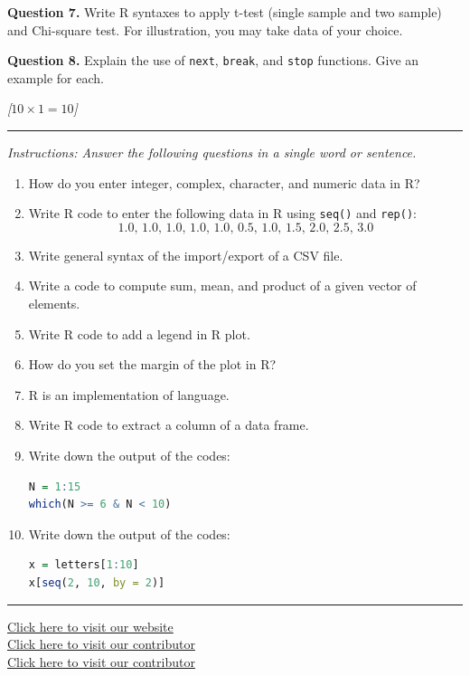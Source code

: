 \documentclass[11pt,a4paper]{article}
\newcommand{\pts}[1]{\hfill   \textit{[#1]}}
\begin{document}
\medskip


\noindent   \textbf{Question 7.} Write R syntaxes to apply t-test (single sample and two sample) and Chi-square test. For illustration, you may take data of your choice.

\medskip


\noindent   \textbf{Question 8.} Explain the use of   \texttt{next},   \texttt{break}, and   \texttt{stop} functions. Give an example for each.

\bigskip


\pts{$10  \times 1 = 10$}
\rule{\linewidth}{0.4pt}\smallskip




\noindent   \textit{Instructions: Answer the following questions in a single word or sentence.}


\begin{enumerate}[label=\arabic*.,leftmargin=*,itemsep=6pt]
  \item How do you enter integer, complex, character, and numeric data in R?
  \item Write R code to enter the following data in R using   \texttt{seq()} and   \texttt{rep()}:
  \[
  1.0, \, 1.0, \, 1.0, \, 1.0, \, 1.0, \, 0.5, \, 1.0, \, 1.5, \, 2.0, \, 2.5, \, 3.0
  \]
  \item Write general syntax of the import/export of a CSV file.
  \item Write a code to compute sum, mean, and product of a given vector of elements.
  \item Write R code to add a legend in R plot.
  \item How do you set the margin of the plot in R?
  \item R is an implementation of \underline{\hspace{1.5cm}} language.
  \item Write R code to extract a column of a data frame.
  \item Write down the output of the codes:
  
\begin{lstlisting}[language=R]
N = 1:15
which(N >= 6 & N < 10)
  \end{lstlisting}
  \item Write down the output of the codes:
  
\begin{lstlisting}[language=R]
x = letters[1:10]
x[seq(2, 10, by = 2)]
  \end{lstlisting}
\end{enumerate}

\vfill
\rule{\linewidth}{0.4pt}

\begin{center}\small
\href{https://bhu-exam.vercel.app/}{Click here to visit our website}\\[4pt]\href{https://me-aryan.vercel.app/}{Click here to visit our contributor}\\[4pt]\href{https://quashan-me.vercel.app/}{Click here to visit our contributor}
\end{center}
\end{document}
